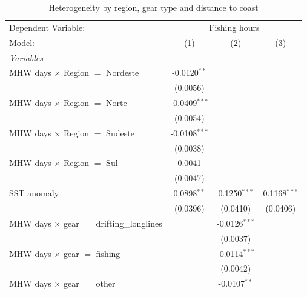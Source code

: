 
\begin{table}[htbp]
   \caption{\label{tab:het} Heterogeneity by region, gear type and distance to coast}
   \centering
   \begin{tabular}{lccc}
      \tabularnewline \midrule \midrule
      Dependent Variable: & \multicolumn{3}{c}{Fishing hours}\\
      Model:                                           & (1)             & (2)             & (3)\\  
      \midrule
      \emph{Variables}\\
      MHW days $\times$ Region $=$ Nordeste            & -0.0120$^{**}$  &                 &   \\   
                                                       & (0.0056)        &                 &   \\   
      MHW days $\times$ Region $=$ Norte               & -0.0409$^{***}$ &                 &   \\   
                                                       & (0.0054)        &                 &   \\   
      MHW days $\times$ Region $=$ Sudeste             & -0.0108$^{***}$ &                 &   \\   
                                                       & (0.0038)        &                 &   \\   
      MHW days $\times$ Region $=$ Sul                 & 0.0041          &                 &   \\   
                                                       & (0.0047)        &                 &   \\   
      SST anomaly                                      & 0.0898$^{**}$   & 0.1250$^{***}$  & 0.1168$^{***}$\\   
                                                       & (0.0396)        & (0.0410)        & (0.0406)\\   
      MHW days $\times$ gear $=$ drifting\_longlines   &                 & -0.0126$^{***}$ &   \\   
                                                       &                 & (0.0037)        &   \\   
      MHW days $\times$ gear $=$ fishing               &                 & -0.0114$^{***}$ &   \\   
                                                       &                 & (0.0042)        &   \\   
      MHW days $\times$ gear $=$ other                 &                 & -0.0107$^{**}$  &   \\   

\end{tabular}
\end{table}
